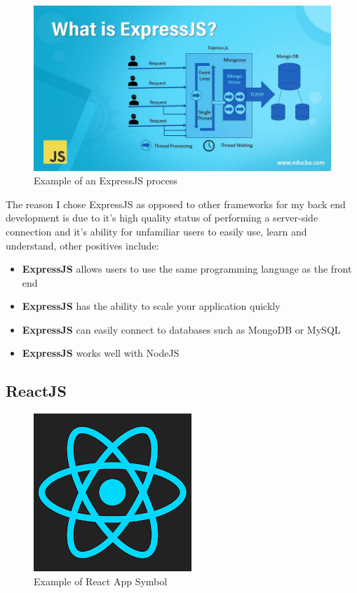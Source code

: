 \begin{figure}[H]
  \includegraphics[scale=0.4]{img/whatisexpressjs.jpg}
  \centering
  \caption{Example of an ExpressJS process}
  \label{fig: What is ExpressJS?}
\end{figure}

The reason I chose ExpressJS as opposed to other frameworks for my back end development is due to it's high quality status of performing a server-side connection and it's ability for unfamiliar users to easily use, learn and understand, other positives include:

\begin{itemize}
\item\textbf{ExpressJS} allows users to use the same programming language as the front end
\item\textbf{ExpressJS} has the ability to scale your application quickly
\item\textbf{ExpressJS} can easily connect to databases such as MongoDB or MySQL
\item\textbf{ExpressJS} works well with NodeJS
\end{itemize}

\subsection{ReactJS}

\begin{figure}[H]
  \includegraphics[scale=1.0]{img/reatcjspic.png}
  \centering
  \caption{Example of React App Symbol}
  \label{fig: React App Symbol}
\end{figure}

